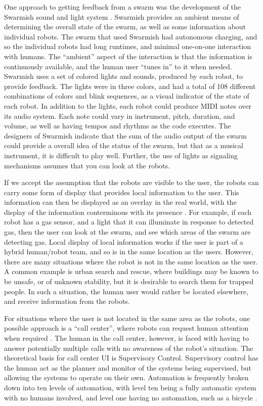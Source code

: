 One approach to getting feedback from a swarm was the development of the Swarmish sound and light system \citep{mclurkin2006speaking}. 
Swarmish provides an ambient means of determining the overall state of the swarm, as well as some information about individual robots. 
The swarm that used Swarmish had autonomous charging, and so the individual robots had long runtimes, and minimal one-on-one interaction with humans. 
The ``ambient'' aspect of the interaction is that the information is continuously available, and the human user ``tunes in'' to it when needed. 
Swarmish uses a set of colored lights and sounds, produced by each robot, to provide feedback. 
The lights were in three colors, and had a total of 108 different combinations of colors and blink sequences, as a visual indicator of the state of each robot. 
In addition to the lights, each robot could produce MIDI notes over its audio system. 
Each note could vary in instrument, pitch, duration, and volume, as well as having tempos and rhythms as the code executes. 
The designers of Swarmish indicate that the sum of the audio output of the swarm could provide a overall idea of the status of the swarm, but that as a musical instrument, it is difficult to play well. 
Further, the use of lights as signaling mechanisms assumes that you can look at the robots. 

If we accept the assumption that the robots are visible to the user, the robots can carry some form of display that provides local information to the user. 
This information can then be displayed as an overlay in the real world, with the display of the information conterminous with its presence \citep{Daily:2003:WEI:820752.821587}. 
For example, if each robot has a gas sensor, and a light that it can illuminate in response to detected gas, then the user can look at the swarm, and see which areas of the swarm are detecting gas.
Local display of local information works if the user is part of a hybrid human/robot team, and so is in the same location as the users. 
However, there are many situations where the robot is not in the same location as the user. 
A common example is urban search and rescue, where buildings may be known to be unsafe, or of unknown stability, but it is desirable to search them for trapped people. 
In such a situation, the human user would rather be located elsewhere, and receive information from the robots. 

For situations where the user is not located in the same area as the robots, one possible approach is a ``call center'', where robots can request human attention when required \citep{chen2011supervisory}. 
The human in the call center, however, is faced with having to answer potentially multiple calls with no awareness of the robot's situation. 
The theoretical basis for call center UI is Supervisory Control. 
Supervisory control has the human act as the planner and monitor of the systems being supervised, but allowing the systems to operate on their own.
Automation is frequently broken down into ten levels of automation, with level ten being a fully automatic system with no humans involved, and level one having no automation, such as a bicycle \citep{parasuraman2000model}. 

